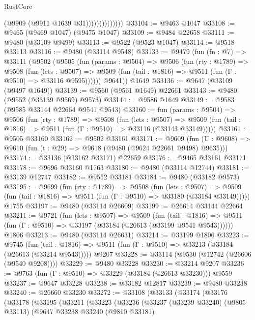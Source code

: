 \begin{lexlean}{RustCore}
\begin{coremodule}
                            (@9909 (@9911 @1639 @31))))))))))))))
@33104 := @9463 @1047
@33108 := @9465 (@9469 @1047) (@9475 @1047)
@33109 := @9484 @22658
@33111 := @9480 (@33109 @9499)
@33113 := @9522 (@9523 @1047)
@33114 := @9518 @33113
@33116 := @9480 (@33114 @9548)
@33133 := @9479
    (fun (fn : @7) =>
    @33111
      (@9502
        (@9505
          (fun (params : @9504) =>
          @9506
            (fun (rty : @1789) =>
            @9508
              (fun (lets : @9507) =>
              @9509 (fun (tail : @1816) => @9511 (fun (Γ : @9510) => @33116 @9595))))))
        @9641))
    @1649
@33136 := @9647 (@33109 (@9497 @1649))
@33139 := @9560 (@9561 @1649) @22661
@33143 := @9480 (@9552 (@33139 @9569) @9573)
@33144 := @9586 @1649
@33149 := @9583 (@9585 @33144 @22664 @9541 @9543)
@33160 := fun (params : @9504) =>
  @9506
    (fun (rty : @1789) =>
    @9508
      (fun (lets : @9507) =>
      @9509 (fun (tail : @1816) => @9511 (fun (Γ : @9510) => @33116 (@33143 @33149)))))
@33161 := @9505 @33160
@33162 := @9502 @33161
@33171 := @9609
    (fun (U : @9608) => @9610 (fun (t : @29) => @9618 (@9480 (@9624 @22661 @9498) @9635)))
@33174 := @33136 (@33162 @33171) @22659
@33176 := @9465 @33161 @33171
@33178 := @9696 @33160 @1763
@33180 := @9480 (@33114 @12744)
@33181 := @33139 @12747
@33182 := @9552 @33181
@33184 := @9480 (@33182 @9573)
@33195 := @9699
    (fun (rty : @1789) =>
    @9508
      (fun (lets : @9507) =>
      @9509 (fun (tail : @1816) => @9511 (fun (Γ : @9510) => @33180 (@33184 @33149)))))
    @1755
@33197 := @9480 (@33114 @26609)
@33199 := @26614 @33144 @22664
@33211 := @9721
    (fun (lets : @9507) =>
    @9509
      (fun (tail : @1816) =>
      @9511 (fun (Γ : @9510) => @33197 (@33184 (@26613 (@33199 @9541 @9543))))))
    @1806
@33213 := @9480 (@33114 @26631)
@33214 := @33199 @1806
@33223 := @9745
    (fun (tail : @1816) => @9511 (fun (Γ : @9510) => @33213 (@33184 (@26613 (@33214 @9543)))))
    @9207
@33228 := @33114 (@9530 (@12742 (@26606 (@9540 @9208))))
@33229 := @9480 @33228
@33230 := @33214 @9207
@33236 := @9763 (fun (Γ : @9510) => @33229 (@33184 (@26613 @33230))) @9559
@33237 := @9647 @33228
@33238 := @33182 @12817
@33239 := @9480 @33238
@33240 := @26660 @33230
@33272 := @33108
    (@33133
      (@33174
        (@33176
          (@33178
            (@33195
              (@33211
                (@33223
                  (@33236
                    (@33237
                      (@33239 @33240)
                      (@9805 @33113)
                      (@9647
                        @33238
                        @33240
                        (@9810 @33181)

\end{coremodule}
\end{lexlean}
